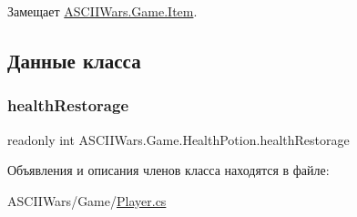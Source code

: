 Замещает \hyperlink{class_a_s_c_i_i_wars_1_1_game_1_1_item_a52412546f837bfc65a3aa9d728fa142f}{A\+S\+C\+I\+I\+Wars.\+Game.\+Item}.



\subsection{Данные класса}
\hypertarget{class_a_s_c_i_i_wars_1_1_game_1_1_health_potion_aa337067f250678b0825d86fc3e2868c5}{}\label{class_a_s_c_i_i_wars_1_1_game_1_1_health_potion_aa337067f250678b0825d86fc3e2868c5} 
\subsubsection{\texorpdfstring{health\+Restorage}{healthRestorage}}
{\footnotesize\ttfamily readonly int A\+S\+C\+I\+I\+Wars.\+Game.\+Health\+Potion.\+health\+Restorage}



Объявления и описания членов класса находятся в файле\+:\begin{DoxyCompactItemize}
\item 
A\+S\+C\+I\+I\+Wars/\+Game/\hyperlink{_player_8cs}{Player.\+cs}\end{DoxyCompactItemize}
